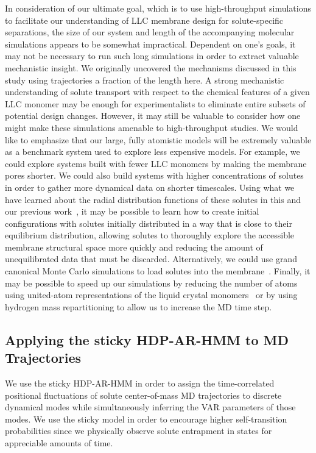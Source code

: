 \documentclass[journal=jpcbfk,manuscript=article]{achemso}
\begin{document}
  In consideration of our ultimate goal, which is to use high-throughput simulations to 
  facilitate our understanding of LLC membrane design for solute-specific separations, the size 
  of our system and length of the accompanying molecular simulations appears to be somewhat 
  impractical. Dependent on one's goals, it may not be necessary to run such long simulations in order 
  to extract valuable mechanistic insight. We originally uncovered the mechanisms discussed
  in this study using trajectories a fraction of the length here.\cite{coscia_chemically_2019} A 
  strong mechanistic understanding of solute transport with respect to the chemical features of a 
  given LLC monomer may be enough for experimentalists to eliminate entire subsets of potential
  design changes. However, it may still be valuable to consider how one might make these simulations
  amenable to high-throughput studies. We would like to emphasize that our large, fully atomistic 
  models will be extremely valuable as a benchmark system used to explore less expensive models. 
  For example, we could explore systems built with fewer LLC monomers by making the membrane pores
  shorter. We could also build systems with higher concentrations of solutes in order to gather more 
  dynamical data on shorter timescales. Using what we have learned about the radial distribution
  functions of these solutes in this and our previous work~\cite{coscia_chemically_2019}, it may be possible to 
  learn how to create initial configurations with solutes initially distributed in a way that
  is close to their equilibrium distribution, allowing solutes to thoroughly explore the 
  accessible membrane structural space more quickly and reducing the amount of unequilibrated
  data that must be discarded. Alternatively, we could use grand canonical Monte Carlo simulations
  to load solutes into the membrane~\cite{snurr_prediction_1993}. Finally, it may be possible 
  to speed up our simulations by reducing the number of atoms using united-atom representations
  of the liquid crystal monomers~\cite{horta_gromos-compatible_2016} or by using hydrogen mass 
  repartitioning to allow us to increase the MD time step.~\cite{hopkins_long-time-step_2015}

  \subsection{Applying the sticky HDP-AR-HMM to MD Trajectories}\label{method:HDP-AR-HMM}

  We use the sticky HDP-AR-HMM in order to assign the time-correlated positional 
  fluctuations of solute center-of-mass MD trajectories to discrete dynamical modes while 
  simultaneously inferring the VAR parameters of those modes. We use the sticky model
  in order to encourage higher self-transition probabilities since we physically observe
  solute entrapment in states for appreciable amounts of time. 
  
\end{document}

